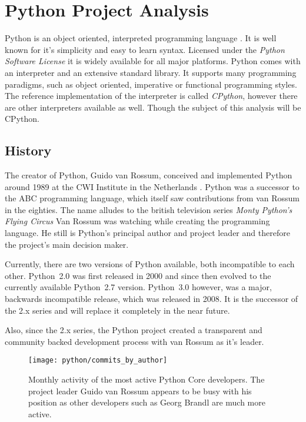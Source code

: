 \section{Python Project Analysis} %


Python is an object oriented, interpreted programming language
\cite{PythonAbout}. It is well known for it's simplicity and easy to learn
syntax. Licensed under the \emph{Python Software License} \cite{PythonLicence}
it is widely available for all major platforms. Python comes with an
interpreter and an extensive standard library. It supports many programming
paradigms, such as object oriented, imperative or functional programming
styles. The reference implementation of the interpreter is called
\emph{CPython}, however there are other interpreters available as well. Though
the subject of this analysis will be CPython.

\subsection{History} %

The creator of Python, Guido van Rossum, conceived and implemented Python
around 1989 at the CWI Institute in the Netherlands \cite{Venners2003}. Python
was a successor to the ABC programming language, which itself saw contributions
from van Rossum in the eighties. The name alludes to the british television
series \emph{Monty Python's Flying Circus} Van Rossum was watching while
creating the programming language. He still is Python's principal author and
project leader and therefore the project's main decision maker.

Currently, there are two versions of Python available, both incompatible to
each other. Python~2.0 was first released in 2000 and since then evolved to the
currently available Python~2.7 version. Python~3.0 however, was a major,
backwards incompatible release, which was released in 2008. It is the successor
of the 2.x series and will replace it completely in the near future.

Also, since the 2.x series, the Python project created a transparent and
community backed development process with van Rossum as it's leader.

\begin{figure}[htbp]
  \centering
  \texttt{[image: python/commits\_by\_author]}
  \caption[Commits by most active authors, Python]
  {Monthly activity of the most active Python Core developers. The project
    leader Guido van Rossum appears to be busy with his position as other
    developers such as Georg Brandl are much more active.}
\end{figure}

